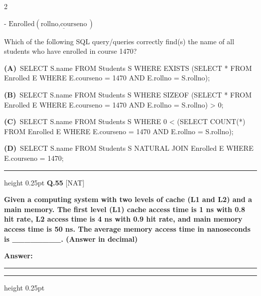 \documentclass[a4paper,10pt,twoside]{article}
\begin{document}
\begin{multicols}{2}
{- $\text{Enrolled}(\underline{\text{rollno}, \text{courseno}})$
\par\smallskip
Which of the following SQL query/queries correctly find(s) the name of all students who have enrolled in course 1470? \par}
\par\vspace{2pt}\noindent
\textbf{(A)}~SELECT S.name \newline FROM Students S \newline WHERE EXISTS (SELECT * FROM Enrolled E WHERE E.courseno = 1470 AND E.rollno = S.rollno);\par\vspace{2pt}\noindent
\textbf{(B)}~SELECT S.name \newline FROM Students S \newline WHERE SIZEOF (SELECT * FROM Enrolled E WHERE E.courseno = 1470 AND E.rollno = S.rollno) > 0;\par\vspace{2pt}\noindent
\textbf{(C)}~SELECT S.name \newline FROM Students S \newline WHERE 0 < (SELECT COUNT(*) FROM Enrolled E WHERE E.courseno = 1470 AND E.rollno = S.rollno);\par\vspace{2pt}\noindent
\textbf{(D)}~SELECT S.name \newline FROM Students S NATURAL JOIN Enrolled E \newline WHERE E.courseno = 1470;
\par\vspace{6pt}\hrule height 0.25pt\vspace{6pt}
\noindent\textbf{Q.55} \hfill {\footnotesize\textsf{[NAT]}}
\par\vspace{2pt}
{\bfseries Given a computing system with two levels of cache (L1 and L2) and a main memory. The first level (L1) cache access time is 1 ns with 0.8 hit rate, L2 access time is 4 ns with 0.9 hit rate, and main memory access time is 50 ns. The average memory access time in nanoseconds is \_\_\_\_\_\_\_\_. (Answer in decimal) \par}
\par\vspace{3pt}\noindent\textbf{Answer:} \rule{3.2cm}{0.4pt}
\par\vspace{6pt}\hrule height 0.25pt\vspace{6pt}

\end{multicols}
\end{document}
